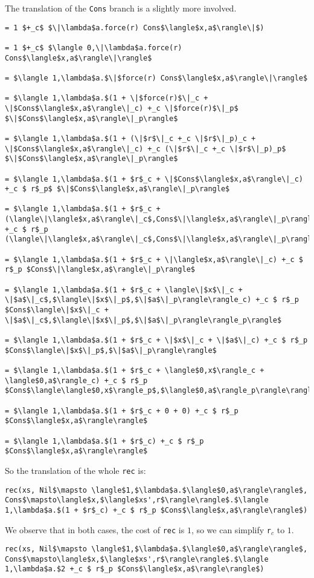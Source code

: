 \documentclass[12pt,letterpaper]{article}
\begin{document}
The translation of the \texttt{Cons} branch is a slightly more involved.
\begin{lstlisting}
= 1 $+_c$ $\|\lambda$a.force(r) Cons$\langle$x,a$\rangle\|$)

= 1 $+_c$ $\langle 0,\|\lambda$a.force(r) Cons$\langle$x,a$\rangle\|\rangle$

= $\langle 1,\lambda$a.$\|$force(r) Cons$\langle$x,a$\rangle\|\rangle$

= $\langle 1,\lambda$a.$(1 + \|$force(r)$\|_c + \|$Cons$\langle$x,a$\rangle\|_c) +_c \|$force(r)$\|_p$ $\|$Cons$\langle$x,a$\rangle\|_p\rangle$

= $\langle 1,\lambda$a.$(1 + (\|$r$\|_c +_c \|$r$\|_p)_c + \|$Cons$\langle$x,a$\rangle\|_c) +_c (\|$r$\|_c +_c \|$r$\|_p)_p$ $\|$Cons$\langle$x,a$\rangle\|_p\rangle$

= $\langle 1,\lambda$a.$(1 + $r$_c + \|$Cons$\langle$x,a$\rangle\|_c) +_c $ r$_p$ $\|$Cons$\langle$x,a$\rangle\|_p\rangle$

= $\langle 1,\lambda$a.$(1 + $r$_c + (\langle\|\langle$x,a$\rangle\|_c$,Cons$\|\langle$x,a$\rangle\|_p\rangle)_c) +_c $ r$_p (\langle\|\langle$x,a$\rangle\|_c$,Cons$\|\langle$x,a$\rangle\|_p\rangle)_p\rangle$

= $\langle 1,\lambda$a.$(1 + $r$_c + \|\langle$x,a$\rangle\|_c) +_c $ r$_p $Cons$\|\langle$x,a$\rangle\|_p\rangle$

= $\langle 1,\lambda$a.$(1 + $r$_c + \langle\|$x$\|_c + \|$a$\|_c$,$\langle\|$x$\|_p$,$\|$a$\|_p\rangle\rangle_c) +_c $ r$_p $Cons$\langle\|$x$\|_c + \|$a$\|_c$,$\langle\|$x$\|_p$,$\|$a$\|_p\rangle\rangle_p\rangle$

= $\langle 1,\lambda$a.$(1 + $r$_c + \|$x$\|_c + \|$a$\|_c) +_c $ r$_p $Cons$\langle\|$x$\|_p$,$\|$a$\|_p\rangle\rangle$

= $\langle 1,\lambda$a.$(1 + $r$_c + \langle$0,x$\rangle_c + \langle$0,a$\rangle_c) +_c $ r$_p $Cons$\langle\langle$0,x$\rangle_p$,$\langle$0,a$\rangle_p\rangle\rangle$

= $\langle 1,\lambda$a.$(1 + $r$_c + 0 + 0) +_c $ r$_p $Cons$\langle$x,a$\rangle\rangle$

= $\langle 1,\lambda$a.$(1 + $r$_c) +_c $ r$_p $Cons$\langle$x,a$\rangle\rangle$
\end{lstlisting}
So the translation of the whole \texttt{rec} is:
\begin{lstlisting}
rec(xs, Nil$\mapsto \langle$1,$\lambda$a.$\langle$0,a$\rangle\rangle$, Cons$\mapsto\langle$x,$\langle$xs',r$\rangle\rangle$.$\langle 1,\lambda$a.$(1 + $r$_c) +_c $ r$_p $Cons$\langle$x,a$\rangle\rangle$)
\end{lstlisting}
We observe that in both cases, the cost of \texttt{rec} is $1$, so we can simplify \texttt{r$_c$} to $1$.
\begin{lstlisting}
rec(xs, Nil$\mapsto \langle$1,$\lambda$a.$\langle$0,a$\rangle\rangle$, Cons$\mapsto\langle$x,$\langle$xs',r$\rangle\rangle$.$\langle 1,\lambda$a.$2 +_c $ r$_p $Cons$\langle$x,a$\rangle\rangle$)
\end{lstlisting}
\end{document}
